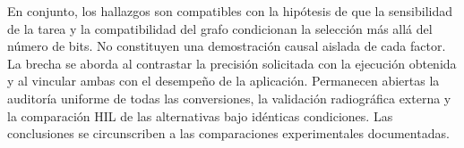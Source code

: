 En conjunto, los hallazgos son compatibles con la hipótesis de que la sensibilidad de la tarea y la compatibilidad del grafo condicionan la selección más allá del número de bits. No constituyen una demostración causal aislada de cada factor. La brecha se aborda al contrastar la precisión solicitada con la ejecución obtenida y al vincular ambas con el desempeño de la aplicación. Permanecen abiertas la auditoría uniforme de todas las conversiones, la validación radiográfica externa y la comparación HIL de las alternativas bajo idénticas condiciones. Las conclusiones se circunscriben a las comparaciones experimentales documentadas.

